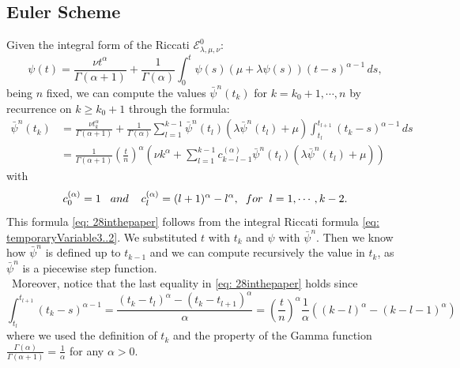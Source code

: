\documentclass[a4paper,italian,11pt]{book}
\theoremstyle{plain}
\theoremstyle{remark}
\theoremstyle{plain}
\begin{document}
\subsection{Euler Scheme}
\noindent
Given the integral form of the Riccati $\mathcal{E}^0_{\lambda, \mu, \nu}$:
\begin{equation}
    \label{eq: temporaryVariable3..2}
    \psi(t) = \frac{\nu t^\alpha}{ \Gamma(\alpha+1)} + \frac{1}{\Gamma(\alpha)} \int_0^t \psi(s) (\mu + \lambda \psi(s)) (t-s) ^ {\alpha - 1} \,ds,
\end{equation}
being $n$ fixed, we can compute the values $\bar{\psi}^n (t_k)$ for $k=k_0+1, \cdots , n$ by recurrence on $k\ge k_0+1$ through the formula:
\begin{equation}
\label{eq: 28inthepaper}
\begin{aligned}
    \bar{\psi}^n(t_k) &= \frac{\nu t_k^\alpha}{\Gamma(\alpha+1)} + \frac{1}{\Gamma(\alpha)} \sum_{l=1}^{k-1} \bar{\psi}^n(t_l) \left( \lambda \bar{\psi}^n(t_l) + \mu \right) \int_{t_l}^{t_{l+1}} (t_k - s)^{\alpha - 1} \, ds
    \\
    &= \frac{1}{\Gamma(\alpha + 1)} \left( \frac{t}{n}\right)^\alpha \left( \nu k^\alpha + \sum_{l=1}^{k-1} c_{k-l-1}^{(\alpha)}  \bar{\psi}^n(t_l) \left( \lambda \bar{\psi}^n(t_l) + \mu \right) \right)
    
\end{aligned}
\end{equation}
with
\begin{equation*}
    c_0^{(\alpha)} = 1 \hspace{0.3cm} and \hspace{0.4cm} c_l^{(\alpha)} = (l+1)^\alpha -l^\alpha, \hspace{0.2cm} for \hspace{0.2cm} l=1,\cdots, k-2.
\end{equation*}
This formula \eqref{eq: 28inthepaper} follows from the integral Riccati formula \eqref{eq: temporaryVariable3..2}. We substituted $t$ with $t_k$ and $\psi$ with $\bar{\psi}^n$. Then we know how $\bar{\psi}^n$ is defined up to $t_{k-1}$ and we can compute recursively the value in $t_k$, as $\bar{\psi}^n$ is a piecewise step function. \\\
Moreover, notice that the last equality in \eqref{eq: 28inthepaper} holds since
$$ \int_{t_l} ^ {t_{l+1}} (t_k - s ) ^ {\alpha -1} = \frac{(t_k-t_l)^\alpha - (t_k-t_{l+1})^\alpha}{ \alpha} = \left( \frac{t}{n}\right)^\alpha \frac{1}{\alpha} \left(  (k-l)^\alpha - (k-l-1)^\alpha \right)$$
where we used the definition of $t_k$ and the property of the Gamma function $\frac{\Gamma(\alpha)}{\Gamma(\alpha+1)} = \frac{1}{\alpha}$ for any $\alpha >0$.
\end{document}
